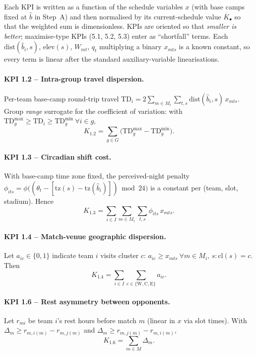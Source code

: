 \documentclass[12pt, letterpaper]{article}
\newcommand{\dist}{\mathrm{dist}}
\newcommand{\elev}{\mathrm{elev}}
\newcommand{\tzone}{\mathrm{tz}}
\newcommand{\cl}{\mathrm{cl}}
\begin{document}
Each KPI is written as a function of the schedule variables $x$
(with base camps fixed at $\hat b$ in Step~A) and then normalised by its
current-schedule value $\overline{K}_\bullet$ so that the weighted sum is
dimensionless. KPIs are oriented so that \emph{smaller is better};
maximise-type KPIs (5.1, 5.2, 5.3) enter as ``shortfall'' terms. Each
$\dist(\hat b_i,s)$, $\elev(s)$, $W_{mt}$, $q_t$ multiplying a binary
$x_{mts}$ is a known constant, so every term is linear after the
standard auxiliary-variable linearisations.

\paragraph{KPI 1.2 -- Intra-group travel dispersion.}
Per-team base-camp round-trip travel
$\mathrm{TD}_i=2\sum_{m\in M_i}\sum_{t,s}\dist(\hat b_i,s)\,x_{mts}.$
Group \emph{range} surrogate for the coefficient of variation: with
$\mathrm{TD}_g^{\max}\ge \mathrm{TD}_i\ge \mathrm{TD}_g^{\min}\ \forall
i\in g$,
\begin{equation}
  K_{1.2}=\sum_{g\in G}\bigl(\mathrm{TD}_g^{\max}-\mathrm{TD}_g^{\min}\bigr).
\end{equation}

\paragraph{KPI 1.3 -- Circadian shift cost.}
With base-camp time zone fixed, the perceived-night penalty
$\phi_{its}=\phi\!\bigl((\theta_t-[\tzone(s)-\tzone(\hat b_i)])\bmod 24\bigr)$
is a constant per (team, slot, stadium). Hence
\begin{equation}
  K_{1.3}=\sum_{i\in I}\sum_{m\in M_i}\sum_{t,s}\phi_{its}\,x_{mts}.
\end{equation}

\paragraph{KPI 1.4 -- Match-venue geographic dispersion.}
Let $a_{ic}\in\{0,1\}$ indicate team $i$ visits cluster $c$:
$a_{ic}\ge x_{mts}\ \forall m\in M_i,\,s:\cl(s)=c$. Then
\begin{equation}
  K_{1.4}=\sum_{i\in I}\sum_{c\in\{\mathrm W,\mathrm C,\mathrm E\}} a_{ic}.
\end{equation}

\paragraph{KPI 1.6 -- Rest asymmetry between opponents.}
Let $r_{mi}$ be team $i$'s rest hours before match $m$ (linear in $x$
via slot times). With $\Delta_m\ge r_{m,i(m)}-r_{m,j(m)}$ and
$\Delta_m\ge r_{m,j(m)}-r_{m,i(m)}$,
\begin{equation}
  K_{1.6}=\sum_{m\in M}\Delta_m .
\end{equation}
\end{document}
